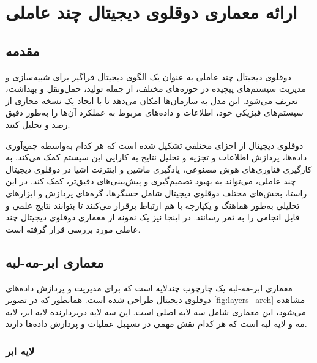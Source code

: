 
\chapter{ارائه معماری دوقلوی دیجیتال چند عاملی}


\section{مقدمه}

دوقلوی دیجیتال چند عاملی به عنوان یک الگوی دیجیتال فراگیر برای شبیه‌سازی و مدیریت سیستم‌های پیچیده در حوزه‌های مختلف، از جمله تولید، حمل‌ونقل و بهداشت، تعریف می‌شود. این مدل به سازمان‌ها امکان می‌دهد تا با ایجاد یک نسخه مجازی از سیستم‌های فیزیکی خود، اطلاعات و داده‌های مربوط به عملکرد آن‌ها را به‌طور دقیق رصد و تحلیل کنند.

دوقلوی دیجیتال از اجزای مختلفی تشکیل شده است که هر کدام به‌واسطه جمع‌آوری داده‌ها، پردازش اطلاعات و تجزیه و تحلیل نتایج به کارایی این سیستم کمک می‌کند. به کارگیری فناوری‌های هوش مصنوعی، یادگیری ماشین و اینترنت اشیا در دوقلوی دیجیتال چند عاملی، می‌تواند به بهبود تصمیم‌گیری و پیش‌بینی‌های دقیق‌تر، کمک کند. در این راستا، بخش‌های مختلف دوقلوی دیجیتال شامل حسگرها، گره‌های پردازش و ابزارهای تحلیلی به‌طور هماهنگ و یکپارچه با هم ارتباط برقرار می‌کنند تا بتوانند نتایج علمی و قابل انجامی را به ثمر رسانند. در اینجا نیز یک نمونه از معماری دوقلوی دیجیتال چند عاملی مورد بررسی قرار گرفته است.
\cite{b15}

\section{معماری ابر-مه-لبه}
معماری ابر-مه-لبه
یک چارچوب چندلایه است که برای مدیریت و پردازش داده‌های دوقلوی دیجیتال طراحی شده است. همانطور که در تصویر \ref{fig:layers_arch} مشاهده‌ می‌شود، این معماری شامل سه لایه اصلی است. این  سه لایه دربردارنده لایه ابر، لایه مه و لایه لبه است که هر کدام نقش مهمی در تسهیل عملیات و پردازش داده‌ها دارند.
\subsection{لایه ابر}

